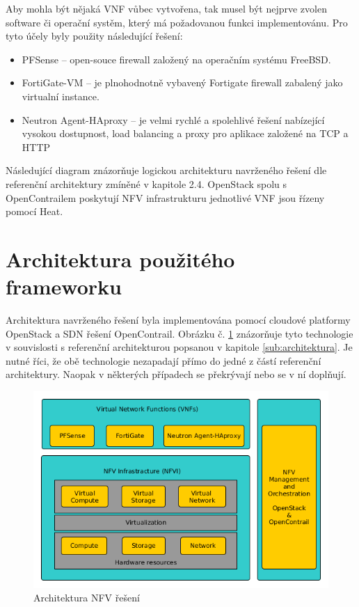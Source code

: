 Aby mohla být nějaká VNF vůbec vytvořena, tak musel být nejprve zvolen software či operační systěm, který má požadovanou funkci implementovánu. Pro tyto účely byly použity následující řešení:

\begin{itemize}
\item PFSense – open-souce firewall založený na operačním systému FreeBSD.
\item FortiGate-VM – je plnohodnotně vybavený Fortigate firewall zabalený jako virtualní instance.
\item Neutron Agent-HAproxy – je velmi rychlé a spolehlivé řešení nabízející vysokou dostupnost, load balancing a proxy pro aplikace založené na TCP a HTTP
\end{itemize}

Následující diagram znázorňuje logickou architekturu navrženého řešení dle referenční architektury zmíněné v kapitole 2.4. OpenStack spolu s OpenContrailem poskytují NFV infrastrukturu jednotlivé VNF jsou řízeny pomocí Heat.

\section{Architektura použitého frameworku}

Architektura navrženého řešení byla implementována pomocí cloudové platformy OpenStack a SDN řešení OpenContrail. Obrázku č. \ref{fig:VNF_overview} znázorňuje tyto technologie v souvislosti s referenční architekturou popsanou v kapitole \ref{sub:architektura}. Je nutné říci, že obě technologie nezapadají přímo do jedné z částí referenční architektury. Naopak v některých případech se překrývají nebo se v ní doplňují.

\begin{figure}[h]
\begin{centering}
\includegraphics[scale=0.51]{images/VNF_overview}
\par\end{centering}
\caption{Architektura NFV řešení\label{fig:VNF_overview}}
\end{figure}

